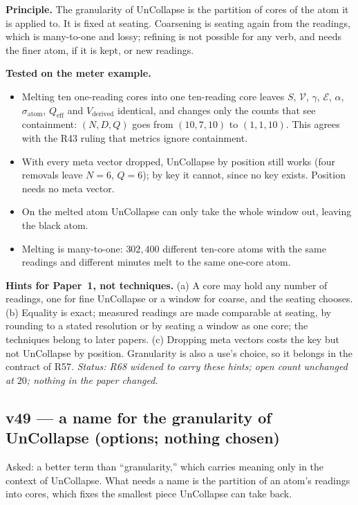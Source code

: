 \documentclass[11pt]{article}
\begin{document}
\textbf{Principle.} The granularity of UnCollapse is the partition of cores of the atom it is applied to. It is fixed at seating. Coarsening is seating again from the readings, which is many-to-one and lossy; refining is not possible for any verb, and needs the finer atom, if it is kept, or new readings.

\textbf{Tested on the meter example.}
\begin{itemize}
\item Melting ten one-reading cores into one ten-reading core leaves $S$, $\mathcal V$, $\gamma$, $\mathcal E$, $\alpha$, $\sigma_{\text{atom}}$, $Q_{\text{eff}}$ and $V_{\text{derived}}$ identical, and changes only the counts that see containment: $(N,D,Q)$ goes from $(10,7,10)$ to $(1,1,10)$.
This agrees with the R43 ruling that metrics ignore containment.
\item With every meta vector dropped, UnCollapse by position still works (four removals leave $N=6$, $Q=6$); by key it cannot, since no key exists. Position needs no meta vector.
\item On the melted atom UnCollapse can only take the whole window out, leaving the black atom.
\item Melting is many-to-one: $302{,}400$ different ten-core atoms with the same readings and different minutes melt to the same one-core atom.
\end{itemize}

\textbf{Hints for Paper~1, not techniques.} (a) A core may hold any number of readings, one for fine UnCollapse or a window for coarse, and the seating chooses. (b) Equality is exact; measured readings are made comparable at seating, by rounding to a stated resolution or by seating a window as one core;
the techniques belong to later papers. (c) Dropping meta vectors costs the key but not UnCollapse by position. Granularity is also a use's choice, so it belongs in the contract of R57.
\emph{Status: R68 widened to carry these hints; open count unchanged at $20$; nothing in the paper changed.}


\subsection*{v49 --- a name for the granularity of UnCollapse (options; nothing chosen)}
Asked: a better term than ``granularity,'' which carries meaning only in the context of UnCollapse. What needs a name is the partition of an atom's readings into cores, which fixes the smallest piece UnCollapse can take back.
\end{document}
